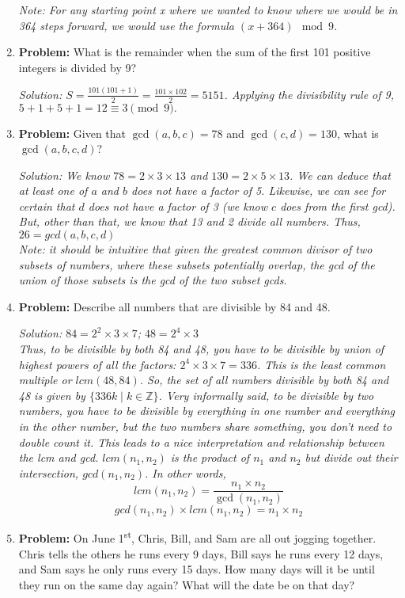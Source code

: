 \documentclass{article}
\begin{document}
\begin{enumerate}
    \textit{Note: For any starting point x where we wanted to know where we would be in 364 steps forward, we would use the formula $(x + 364) \mod 9$.}

    \item \textbf{Problem:}
    What is the remainder when the sum of the first 101 positive integers is divided by 9?
    
    \textit{Solution: $S = \frac{101(101 + 1)}{2} = \frac{101 \times 102}{2} = 5151$. Applying the divisibility rule of 9, $5 + 1 + 5 + 1 = 12 \equiv 3 \pmod{9}.$}

    \item \textbf{Problem:}
    Given that \(\gcd(a, b, c) = 78\) and \(\gcd(c, d) = 130\), what is \(\gcd(a, b, c, d)\)?

    \textit{Solution: We know $78 = 2\times3\times13$ and $130 = 2\times5\times13$. We can deduce that at least one of $a$ and $b$ does not have a factor of 5. Likewise, we can see for certain that $d$ does not have a factor of 3 (we know $c$ does from the first gcd). But, other than that, we know that 13 and 2 divide all numbers. Thus, $26 = gcd(a,b,c,d)$ \\
    Note: it should be intuitive that given the greatest common divisor  of two subsets of numbers, where these subsets potentially overlap, the gcd of the union of those subsets is the gcd of the two subset gcds. 
    }
    \item \textbf{Problem:}
    Describe all numbers that are divisible by 84 and 48. 
    
    \textit{Solution: $84 = 2^2\times3\times7$; $48 = 2^4\times3$
    \\Thus, to be divisible by both 84 and 48, you have to be divisible by union of highest powers of all the factors: $2^4\times3\times7 = 336$. This is the least common multiple or $lcm(48,84)$. So, the set of all numbers divisible by both 84 and 48 is given by $\{336k \mid k \in \mathbb{Z}\}$.
    Very informally said, to be divisible by two numbers, you have to be divisible by everything in one number and everything in the other number, but the two numbers share something, you don't need to double count it. This leads to a nice interpretation and relationship between the lcm and gcd. $lcm(n_1,n_2)$ is the product of $n_1$ and $n_2$ but divide out their intersection, $gcd(n_1,n_2)$. In other words,  $$lcm(n_1, n_2) = \frac{n_1 \times n_2}{\gcd(n_1, n_2)}$$
    $$gcd(n_1, n_2)\times lcm(n_1, n_2) = n_1 \times n_2$$
    }

    \item \textbf{Problem:}
    On June 1\textsuperscript{st}, Chris, Bill, and Sam are all out jogging together. Chris tells the others he runs every 9 days, Bill says he runs every 12 days, and Sam says he only runs every 15 days. How many days will it be until they run on the same day again? What will the date be on that day?
    

\end{enumerate}
\end{document}
